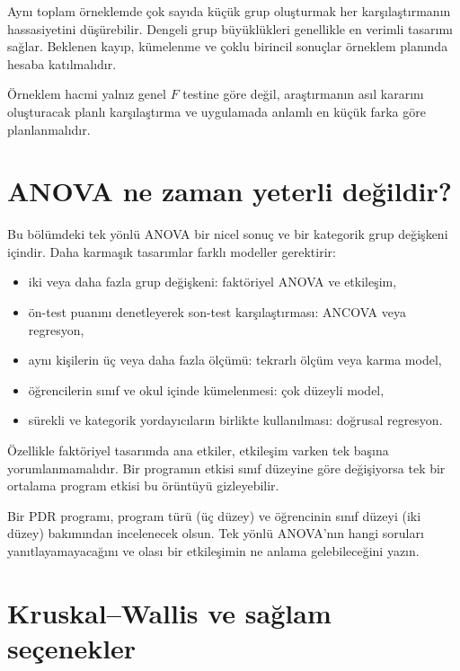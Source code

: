 Aynı toplam örneklemde çok sayıda küçük grup oluşturmak her karşılaştırmanın
hassasiyetini düşürebilir. Dengeli grup büyüklükleri genellikle en verimli
tasarımı sağlar. Beklenen kayıp, kümelenme ve çoklu birincil sonuçlar örneklem
planında hesaba katılmalıdır.

Örneklem hacmi yalnız genel $F$ testine göre değil, araştırmanın asıl kararını
oluşturacak planlı karşılaştırma ve uygulamada anlamlı en küçük farka göre
planlanmalıdır.

\section{ANOVA ne zaman yeterli değildir?}

Bu bölümdeki tek yönlü ANOVA bir nicel sonuç ve bir kategorik grup değişkeni
içindir. Daha karmaşık tasarımlar farklı modeller gerektirir:

\begin{itemize}
  \item iki veya daha fazla grup değişkeni: faktöriyel ANOVA ve etkileşim,
  \item ön-test puanını denetleyerek son-test karşılaştırması: ANCOVA veya regresyon,
  \item aynı kişilerin üç veya daha fazla ölçümü: tekrarlı ölçüm veya karma model,
  \item öğrencilerin sınıf ve okul içinde kümelenmesi: çok düzeyli model,
  \item sürekli ve kategorik yordayıcıların birlikte kullanılması: doğrusal regresyon.
\end{itemize}

Özellikle faktöriyel tasarımda ana etkiler, etkileşim varken tek başına
yorumlanmamalıdır. Bir programın etkisi sınıf düzeyine göre değişiyorsa tek bir
ortalama program etkisi bu örüntüyü gizleyebilir.

\begin{etkinlik}
Bir PDR programı, program türü (üç düzey) ve öğrencinin sınıf düzeyi (iki
düzey) bakımından incelenecek olsun. Tek yönlü ANOVA'nın hangi soruları
yanıtlayamayacağını ve olası bir etkileşimin ne anlama gelebileceğini yazın.
\end{etkinlik}

\section{Kruskal--Wallis ve sağlam seçenekler}

